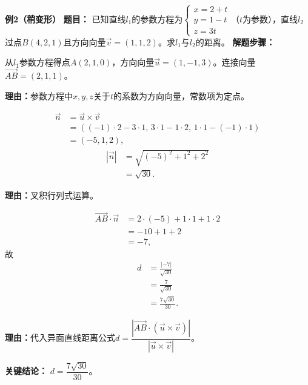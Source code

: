 \begin{examplebox}
	\medskip
	\textbf{\textcolor{CExample}{例2（稍变形）}}
	\textbf{\textcolor{CExample}{题目：}}
	已知直线$l_1$的参数方程为$
	\begin{cases}
		x=2+t\\ y=1-t\\ z=3t
	\end{cases}
	$（$t$为参数），直线$l_2$过点$B(4,2,1)$且方向向量$\vec{v}=(1,1,2)$。求$l_1$与$l_2$的距离。
	\textbf{\textcolor{CExample}{解题步骤：}}
	\begin{description}[style=nextline, leftmargin=2.8em, labelsep=0.5em, itemsep=0.45em]
		\item[\textbf{第一步（提取点与方向）：}]
			从$l_1$参数方程得点$A(2,1,0)$，方向向量$\vec{u}=(1,-1,3)$。连接向量$\overrightarrow{AB}=(2,1,1)$。
			\par\textbf{理由：}参数方程中$x,y,z$关于$t$的系数为方向向量，常数项为定点。
		\item[\textbf{第二步（求叉积与模）：}]
			\[
				\begin{aligned}
					\vec{n} &= \vec{u}\times\vec{v} \\ &= ((-1)\cdot2-3\cdot1,\,3\cdot1-1\cdot2,\,1\cdot1-(-1)\cdot1) \\ &= (-5,1,2),
			\end{aligned}
			\]
			\[
				\begin{aligned}
					|\vec{n}| &= \sqrt{(-5)^2+1^2+2^2} \\ &= \sqrt{30}.
			\end{aligned}
			\]
			\par\textbf{理由：}叉积行列式运算。
		\item[\textbf{第三步（代公式计算）：}]
			\[
				\begin{aligned}
					\overrightarrow{AB}\cdot\vec{n} &= 2\cdot(-5)+1\cdot1+1\cdot2 \\ &= -10+1+2 \\ &= -7,
			\end{aligned}
			\]
			故
			\[
				\begin{aligned}
					d &= \frac{|-7|}{\sqrt{30}} \\ &= \frac{7}{\sqrt{30}} \\ &= \frac{7\sqrt{30}}{30}.
			\end{aligned}
			\]
			\par\textbf{理由：}代入异面直线距离公式$d=\dfrac{|\overrightarrow{AB}\cdot(\vec{u}\times\vec{v})|}{|\vec{u}\times\vec{v}|}$。
	\end{description}
	\textbf{\textcolor{CExample}{关键结论：}}
	\textbf{$d=\dfrac{7\sqrt{30}}{30}$}。


\end{examplebox}
